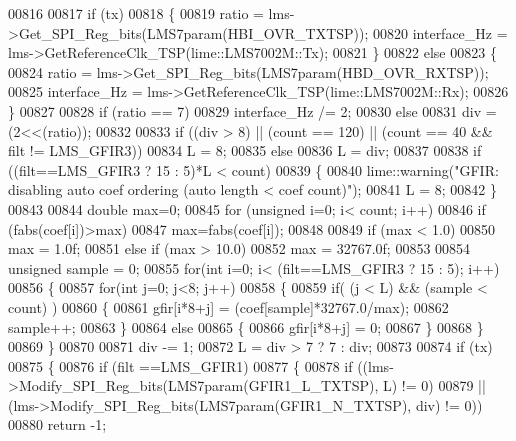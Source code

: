 \begin{DoxyCode}
{{{00816 
00817     \textcolor{keywordflow}{if} (tx)
00818     \{
00819         ratio = lms->Get_SPI_Reg_bits(LMS7param(HBI_OVR_TXTSP));
00820         interface\_Hz = lms->GetReferenceClk_TSP(lime::LMS7002M::Tx);
00821     \}
00822     \textcolor{keywordflow}{else}
00823     \{
00824         ratio = lms->Get_SPI_Reg_bits(LMS7param(HBD_OVR_RXTSP));
00825         interface\_Hz = lms->GetReferenceClk_TSP(lime::LMS7002M::Rx);
00826     \}
00827 
00828     \textcolor{keywordflow}{if} (ratio == 7)
00829         interface\_Hz /= 2;
00830     \textcolor{keywordflow}{else}
00831         div = (2<<(ratio));
00832 
00833     \textcolor{keywordflow}{if} ((div > 8) || (count == 120) || (count == 40 && filt != LMS_GFIR3))
00834         L = 8;
00835     \textcolor{keywordflow}{else}
00836         L = div;
00837 
00838     \textcolor{keywordflow}{if} ((filt==LMS_GFIR3 ? 15 : 5)*L < count)
00839     \{
00840         lime::warning(\textcolor{stringliteral}{"GFIR: disabling auto coef ordering (auto length < coef count)"});
00841         L = 8;
00842     \}
00843 
00844     \textcolor{keywordtype}{double} max=0;
00845     \textcolor{keywordflow}{for} (\textcolor{keywordtype}{unsigned} i=0; i< count; i++)
00846         \textcolor{keywordflow}{if} (fabs(coef[i])>max)
00847             max=fabs(coef[i]);
00848 
00849     \textcolor{keywordflow}{if} (max < 1.0)
00850         max = 1.0f;
00851     \textcolor{keywordflow}{else} \textcolor{keywordflow}{if} (max > 10.0)
00852         max = 32767.0f;
00853 
00854     \textcolor{keywordtype}{unsigned} sample = 0;
00855     \textcolor{keywordflow}{for}(\textcolor{keywordtype}{int} i=0; i< (filt==LMS_GFIR3 ? 15 : 5); i++)
00856     \{
00857         \textcolor{keywordflow}{for}(\textcolor{keywordtype}{int} j=0; j<8; j++)
00858         \{
00859             \textcolor{keywordflow}{if}( (j < L) && (sample < count) )
00860             \{
00861                 gfir[i*8+j] = (coef[sample]*32767.0/max);
00862                 sample++;
00863             \}
00864             \textcolor{keywordflow}{else}
00865             \{
00866                 gfir[i*8+j] = 0;
00867             \}
00868         \}
00869     \}
00870 
00871     div -= 1;
00872     L = div > 7 ? 7 : div;
00873 
00874     \textcolor{keywordflow}{if} (tx)
00875     \{
00876       \textcolor{keywordflow}{if} (filt ==LMS_GFIR1)
00877       \{
00878           \textcolor{keywordflow}{if} ((lms->Modify_SPI_Reg_bits(LMS7param(GFIR1_L_TXTSP), L) != 0)
00879               || (lms->Modify_SPI_Reg_bits(LMS7param(GFIR1_N_TXTSP), div) != 0))
00880               \textcolor{keywordflow}{return} -1;
}}}
\end{DoxyCode}
